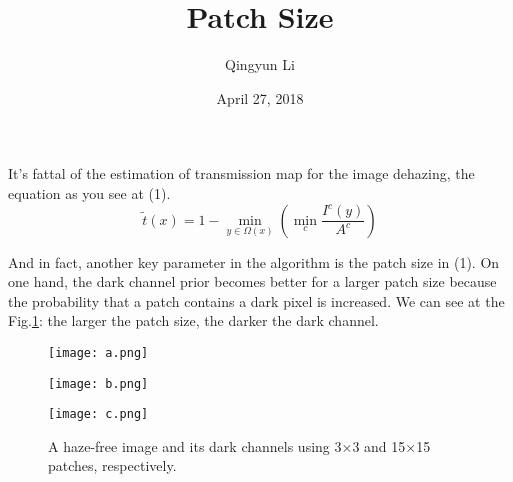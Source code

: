 \documentclass{article}
\author{Qingyun Li}
\date{April 27, 2018}
\title{Patch Size}
\begin{document}
\maketitle
 \par It's fattal of the estimation of transmission map for the image dehazing, the equation as you see at (1).
 \begin{equation}
\tilde{t}(x)=1-\min\limits_{y\in\Omega(x)}(\min\limits_{c}\frac{I^{c}(y)}{A^c})
\end{equation}
\par And in fact, another key parameter in the algorithm is the patch size in (1). On one hand, the dark channel prior becomes better for a larger patch size because the probability that a patch contains a dark pixel is increased. We can see at the Fig.\ref{patch size}: the larger the patch size, the darker the dark channel.
\begin{figure}[htbp]
\begin{minipage}{0.3\linewidth}
\texttt{[image: a.png]}\\
\label{fig:side:a} 
\end{minipage}
\hfill
\begin{minipage}{0.3\linewidth}
\texttt{[image: b.png]}\\
\label{fig:side:b}
\end{minipage} 
\hfill
\begin{minipage}{0.3\linewidth}
\texttt{[image: c.png]}\\
\label{fig:side:c} 
\end{minipage}
\caption{A haze-free image and its dark channels using 3×3 and 15×15 patches, respectively.} \label{patch size}
\end{figure}
\end{document}
